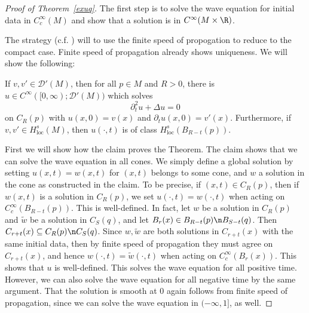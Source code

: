 \documentclass[12pt]{article}
\begin{document}
\begin{proof}[Proof of Theorem~\ref{exuq}]
The first step is to solve the wave equation for initial data in $C_c^\infty(M)$ and show that a solution is in $C^\infty(M\times \R)$.

The strategy (c.f. \cite{Tao}) will to use the finite speed of propogation to reduce to the compact case. Finite speed of propagation already shows uniqueness. We will show the following:
\begin{claim}If $v,v' \in \mathcal D'(M)$, then for all $p \in M$ and $R > 0$, there is $u \in C^\infty([0,\infty);\mathcal D'(M))$ which solves
\[\partial_t^2 u + \Delta u = 0\] on $C_R(p)$ with $u(x,0) = v(x)$ and $\partial_t u(x,0) = v'(x)$. Furthermore, if $v,v' \in H^s_{\text{loc}}(M)$, then $u(\cdot,t)$ is of class $H^s_{\text{loc}}(B_{R-t}(p))$.\end{claim}
First we will show how the claim proves the Theorem. The claim shows that we can solve the wave equation in all cones. We simply define a global solution by setting $u(x,t) = w(x,t)$ for $(x,t)$ belongs to some cone, and $w$ a solution in the cone as constructed in the claim. To be precise, if $(x,t) \in C_R(p)$, then if $w(x,t)$ is a solution in $C_R(p)$, we set $u(\cdot, t) = w(\cdot,t)$ when acting on $C^\infty_c(B_{R-t}(p))$. This is well-defined. In fact, let $w$ be a solution in $C_R(p)$ and $\tilde{w}$ be a solution in $C_S(q)$, and let $B_r(x) \in B_{R-t}(p)\n B_{S-t}(q)$. Then $C_{r+t}(x) \subseteq C_R(p)\n C_S(q)$. Since $w,\tilde{w}$ are both solutions in $C_{r+t}(x)$ with the same initial data, then by finite speed of propagation they must agree on $C_{r+t}(x)$, and hence $w(\cdot, t) = \tilde w(\cdot, t)$ when acting on $C_c^\infty(B_r(x))$. This shows that $u$ is well-defined. This solves the wave equation for all positive time. However, we can also solve the wave equation for all negative time by the same argument. That the solution is smooth at $0$ again follows from finite speed of propagation, since we can solve the wave equation in $(-\infty,1]$, as well.


\end{proof}
\end{document}
